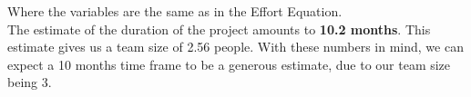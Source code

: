\noindent Where the variables are the same as in the Effort Equation.\\
\newline
	The estimate of the duration of the project amounts to \textbf{10.2 months}. This estimate gives us a team size of 2.56 people.
	With these numbers in mind, we can expect a 10 months time frame to be a generous estimate, due to our team size being 3.
	
	